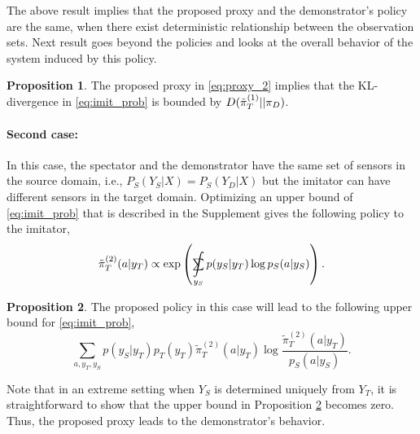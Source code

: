 \documentclass[letterpaper]{article} %
\theoremstyle{definition}%
\theoremstyle{definition}
\newtheorem{proposition}{Proposition}
\newcommand{\Obs}{Y}
\newcommand{\obs}{y}
\newcommand{\todo}[1]{\textcolor{red}{#1}}
\DeclareMathOperator*{\SumInt}{%
	\mathchoice%
	{\ooalign{$\sum$\cr\hidewidth$\displaystyle\int$\hidewidth\cr}}
	{\ooalign{\raisebox{.14\height}{\scalebox{.7}{$\textstyle\sum$}}\cr\hidewidth$\textstyle\int$\hidewidth\cr}}
	{\ooalign{\raisebox{.2\height}{\scalebox{.6}{$\scriptstyle\sum$}}\cr$\scriptstyle\int$\cr}}
	{\ooalign{\raisebox{.2\height}{\scalebox{.6}{$\scriptstyle\sum$}}\cr$\scriptstyle\int$\cr}}
}
\begin{document}
The above result implies that the proposed proxy and the demonstrator's policy are the same, when there exist deterministic relationship between the observation sets.
Next result goes beyond the policies and looks at the overall behavior of the system induced by this policy.


\begin{proposition}\label{pro:imi5}
The proposed proxy in \eqref{eq:proxy_2} implies that the KL-divergence in \eqref{eq:imit_prob} is bounded by 
$\begin{small}
D(\tilde{\pi}^{(1)}_T||\pi_D)
\end{small}$.
\end{proposition}

\paragraph{Second case:}
In this case, the spectator and the demonstrator have the same set of sensors in the source domain, i.e., $P_S(\Obs_S|X)=P_S(\Obs_D|X)$ but the imitator can have different sensors in the target domain.
Optimizing an upper bound of \eqref{eq:imit_prob} that is described in the Supplement gives the following policy to the imitator,
$$
\tilde{\pi}^{(2)}_T(a | \obs_T) \propto \exp\left(\SumInt_{\obs_S}p(\obs_S | \obs_T)\log p_S(a|\obs_S)\right).
$$

\begin{proposition}\label{pro:imi6}
The proposed policy in this case will lead to the following upper bound for  \eqref{eq:imit_prob}, 
$$
\sum_{a, \obs_T, \obs_S} p(\obs_S| \obs_T) p_T(\obs_T)\tilde{\pi}^{(2)}_T(a|\obs_T)\log \frac{\tilde{\pi}^{(2)}_T(a|\obs_T)}{p_S(a|\obs_S)}.
$$
\end{proposition}

Note that in an extreme setting when $\Obs_S$ is determined uniquely from $\Obs_T$, it is straightforward to show that the upper bound in Proposition \ref{pro:imi6} becomes zero. Thus, the proposed proxy leads to the demonstrator's behavior.

\end{document}
